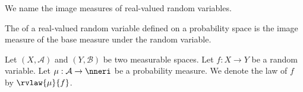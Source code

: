 
\sbasic



\sstart



We name the image
measures of
real-valued random
variables.


The
of a real-valued random variable
defined on a probability space
is the image measure
of the base measure
under the random variable.



Let
$(X, \mathcal{A})$
and
$(Y, \mathcal{B})$
be two measurable spaces.
Let $f: X \to Y$ be
a random variable.
Let
$\mu: \mathcal{A} \to \nneri$
be a probability measure.
We denote the
law of $f$
by $\rvlaw{\mu}{f}$.

\strats
